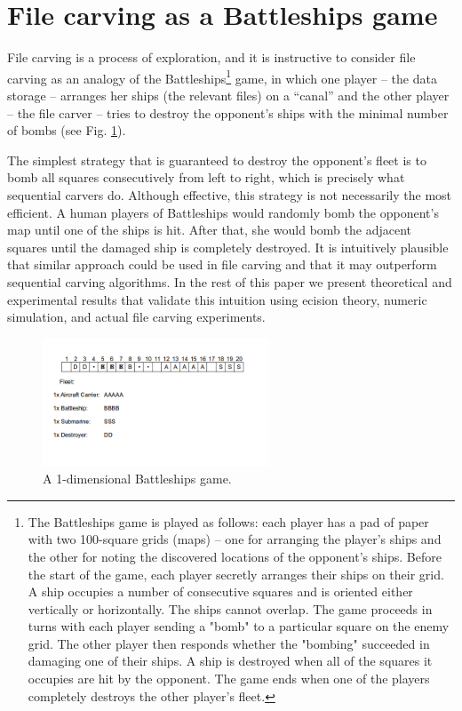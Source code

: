 \documentclass[final,5p,times,twocolumn,authoryear]{elsarticle}
\begin{document}
\section{File carving as a Battleships game}

File carving is a process of exploration, and it is instructive to consider file carving as an analogy of the Battleships\footnote{The Battleships game is played as follows: each player has a pad of paper with two 100-square grids (maps) -- one for arranging the player's ships and the other for noting the discovered locations of the opponent's ships. Before the start of the game, each player secretly arranges their ships on their grid. A ship occupies a number of consecutive squares and is oriented either vertically or horizontally. The ships cannot overlap. The game proceeds in turns with each player sending a "bomb" to a particular square on the enemy grid. The other player then responds whether the "bombing" succeeded in damaging one of their ships. A ship is destroyed when all of the squares it occupies are hit by the opponent. The game ends when one of the players completely destroys the other player's fleet.} game, in which one player -- the data storage -- arranges her ships (the relevant files) on a ``canal'' and the other player -- the file carver -- tries to destroy the opponent's ships with the minimal number of bombs (see Fig. \ref{fig:battleships_on_a_canal}).  

The simplest strategy that is guaranteed to destroy the opponent's fleet is to bomb all squares consecutively from left to right, which is precisely what sequential carvers do. Although effective, this strategy is not necessarily the most efficient. A human players of Battleships would randomly bomb the opponent's map until one of the ships is hit. After that, she would bomb the adjacent squares until the damaged ship is completely destroyed. It is intuitively plausible that similar approach could be used in file carving and that it may outperform sequential carving algorithms. In the rest of this paper we present theoretical and experimental results that validate this intuition using ecision theory, numeric simulation, and actual file carving experiments.

\begin{figure}
  \centerline{\includegraphics[width=0.6\textwidth]{fig3}}
  \caption{A 1-dimensional Battleships game.}
  \label{fig:battleships_on_a_canal}
\end{figure}
\end{document}
